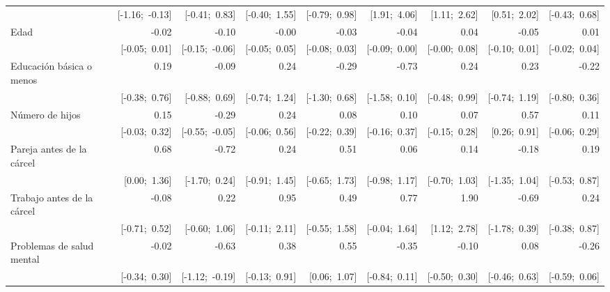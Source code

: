 \begin{sidewaystable}[htp]
\begin{center}
{\begin{tabular}{l D{.}{.}{3.11} D{.}{.}{3.11} D{.}{.}{3.11} D{.}{.}{3.11} D{.}{.}{3.11} D{.}{.}{3.11} D{.}{.}{3.11} D{.}{.}{3.11} }
                           & [-1.16;\ -0.13] & [-0.41;\ 0.83]  & [-0.40;\ 1.55]  & [-0.79;\ 0.98]  & [1.91;\ 4.06]   & [1.11;\ 2.62]   & [0.51;\ 2.02]   & [-0.43;\ 0.68]  \\
Edad                       & -0.02           & -0.10           & -0.00           & -0.03           & -0.04           & 0.04            & -0.05           & 0.01            \\
                           & [-0.05;\ 0.01]  & [-0.15;\ -0.06] & [-0.05;\ 0.05]  & [-0.08;\ 0.03]  & [-0.09;\ 0.00]  & [-0.00;\ 0.08]  & [-0.10;\ 0.01]  & [-0.02;\ 0.04]  \\
Educación básica o menos   & 0.19            & -0.09           & 0.24            & -0.29           & -0.73           & 0.24            & 0.23            & -0.22           \\
                           & [-0.38;\ 0.76]  & [-0.88;\ 0.69]  & [-0.74;\ 1.24]  & [-1.30;\ 0.68]  & [-1.58;\ 0.10]  & [-0.48;\ 0.99]  & [-0.74;\ 1.19]  & [-0.80;\ 0.36]  \\
Número de hijos            & 0.15            & -0.29           & 0.24            & 0.08            & 0.10            & 0.07            & 0.57            & 0.11            \\
                           & [-0.03;\ 0.32]  & [-0.55;\ -0.05] & [-0.06;\ 0.56]  & [-0.22;\ 0.39]  & [-0.16;\ 0.37]  & [-0.15;\ 0.28]  & [0.26;\ 0.91]   & [-0.06;\ 0.29]  \\
Pareja antes de la cárcel  & 0.68            & -0.72           & 0.24            & 0.51            & 0.06            & 0.14            & -0.18           & 0.19            \\
                           & [0.00;\ 1.36]   & [-1.70;\ 0.24]  & [-0.91;\ 1.45]  & [-0.65;\ 1.73]  & [-0.98;\ 1.17]  & [-0.70;\ 1.03]  & [-1.35;\ 1.04]  & [-0.53;\ 0.87]  \\
Trabajo antes de la cárcel & -0.08           & 0.22            & 0.95            & 0.49            & 0.77            & 1.90            & -0.69           & 0.24            \\
                           & [-0.71;\ 0.52]  & [-0.60;\ 1.06]  & [-0.11;\ 2.11]  & [-0.55;\ 1.58]  & [-0.04;\ 1.64]  & [1.12;\ 2.78]   & [-1.78;\ 0.39]  & [-0.38;\ 0.87]  \\
Problemas de salud mental  & -0.02           & -0.63           & 0.38            & 0.55            & -0.35           & -0.10           & 0.08            & -0.26           \\
                           & [-0.34;\ 0.30]  & [-1.12;\ -0.19] & [-0.13;\ 0.91]  & [0.06;\ 1.07]   & [-0.84;\ 0.11]  & [-0.50;\ 0.30]  & [-0.46;\ 0.63]  & [-0.59;\ 0.06]  \\

\end{tabular}}
\end{center}
\end{sidewaystable}
